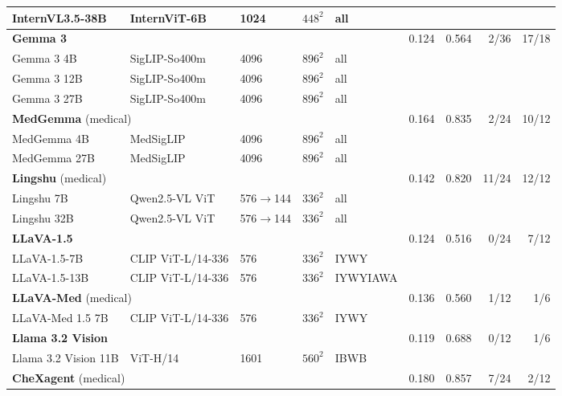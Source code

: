 \documentclass{article}
\begin{document}
\begin{table}[h]
{\begin{tabular}{lllll@{\hspace{8pt}}rrrr}
\quad InternVL3.5-38B & InternViT-6B & 1024 & $448^2$ & all & & & & \\
\midrule
\multicolumn{5}{l}{\textbf{Gemma 3}~\citep{gemma2025gemma3}} & 0.124 & 0.564 & \cellcolor{cfTerra2}2/36 & \cellcolor{cfTerra4}17/18 \\
\quad Gemma 3 4B & SigLIP-So400m & 4096 & $896^2$ & all & & & & \\
\quad Gemma 3 12B & SigLIP-So400m & 4096 & $896^2$ & all & & & & \\
\quad Gemma 3 27B & SigLIP-So400m & 4096 & $896^2$ & all & & & & \\
\midrule
\multicolumn{5}{l}{\textbf{MedGemma} (medical)~\citep{sellergren2025medgemma}} & 0.164 & 0.835 & \cellcolor{cfTerra2}2/24 & \cellcolor{cfTerra3}10/12 \\
\quad MedGemma 4B & MedSigLIP & 4096 & $896^2$ & all & & & & \\
\quad MedGemma 27B & MedSigLIP & 4096 & $896^2$ & all & & & & \\
\midrule
\multicolumn{5}{l}{\textbf{Lingshu} (medical)~\citep{lasa2025lingshu}} & 0.142 & 0.820 & \cellcolor{cfTerra4}11/24 & \cellcolor{cfTerra4}12/12 \\
\quad Lingshu 7B & Qwen2.5-VL ViT & 576$\to$144 & $336^2$ & all & & & & \\
\quad Lingshu 32B & Qwen2.5-VL ViT & 576$\to$144 & $336^2$ & all & & & & \\
\midrule
\multicolumn{5}{l}{\textbf{LLaVA-1.5}~\citep{liu2024improved}} & 0.124 & 0.516 & \cellcolor{cfTerra1}0/24 & \cellcolor{cfTerra3}7/12 \\
\quad LLaVA-1.5-7B & CLIP ViT-L/14-336 & 576 & $336^2$ & IYWY & & & & \\
\quad LLaVA-1.5-13B & CLIP ViT-L/14-336 & 576 & $336^2$ & IYWYIAWA & & & & \\
\midrule
\multicolumn{5}{l}{\textbf{LLaVA-Med} (medical)~\citep{li2023llavamed}} & 0.136 & 0.560 & \cellcolor{cfTerra2}1/12 & \cellcolor{cfTerra2}1/6 \\
\quad LLaVA-Med 1.5 7B & CLIP ViT-L/14-336 & 576 & $336^2$ & IYWY & & & & \\
\midrule
\multicolumn{5}{l}{\textbf{Llama 3.2 Vision}~\citep{meta2024llama32vision}} & 0.119 & 0.688 & \cellcolor{cfTerra1}0/12 & \cellcolor{cfTerra2}1/6 \\
\quad Llama 3.2 Vision 11B & ViT-H/14 & 1601 & $560^2$ & IBWB & & & & \\
\midrule
\multicolumn{5}{l}{\textbf{CheXagent} (medical)~\citep{chen2024chexagent}} & 0.180 & 0.857 & \cellcolor{cfTerra3}7/24 & \cellcolor{cfTerra2}2/12 \\

\end{tabular}}
\end{table}
\end{document}
